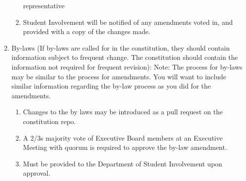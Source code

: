 \begin{enumerate}
\begin{enumerate}
        representative
      \item	Student Involvement will be notified of any amendments voted in, and
        provided with a copy of the changes made.
    \end{enumerate}
  \item	By-laws (If by-laws are called for in the constitution, they should
    contain information subject to frequent change.  The constitution should
    contain the information not required for frequent revision): Note:  The
    process for by-laws may be similar to the process for amendments.  You will
    want to include similar information regarding the by-law process as you did
    for the amendments.
    \begin{enumerate}
      \item	Changes to the by laws may be introduced as a pull request on the
        constitution repo.
      \item	A 2/3s majority vote of Executive Board members at an Executive
        Meeting with quorum is required to approve the by-law amendment.
      \item	Must be provided to the Department of Student Involvement upon
      approval.
    \end{enumerate}
\end{enumerate}
